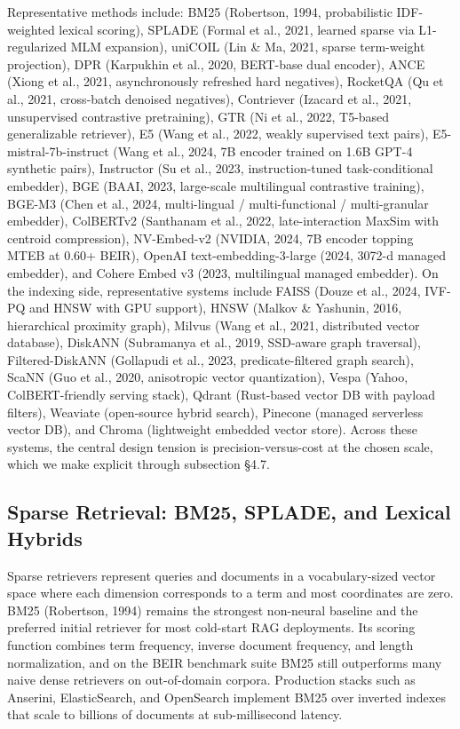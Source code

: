 \documentclass{article}
\begin{document}
Representative methods include: BM25 (Robertson, 1994, probabilistic IDF-weighted lexical scoring), SPLADE (Formal et al., 2021, learned sparse via L1-regularized MLM expansion), uniCOIL (Lin \& Ma, 2021, sparse term-weight projection), DPR (Karpukhin et al., 2020, BERT-base dual encoder), ANCE (Xiong et al., 2021, asynchronously refreshed hard negatives), RocketQA (Qu et al., 2021, cross-batch denoised negatives), Contriever (Izacard et al., 2021, unsupervised contrastive pretraining), GTR (Ni et al., 2022, T5-based generalizable retriever), E5 (Wang et al., 2022, weakly supervised text pairs), E5-mistral-7b-instruct (Wang et al., 2024, 7B encoder trained on 1.6B GPT-4 synthetic pairs), Instructor (Su et al., 2023, instruction-tuned task-conditional embedder), BGE (BAAI, 2023, large-scale multilingual contrastive training), BGE-M3 (Chen et al., 2024, multi-lingual / multi-functional / multi-granular embedder), ColBERTv2 (Santhanam et al., 2022, late-interaction MaxSim with centroid compression), NV-Embed-v2 (NVIDIA, 2024, 7B encoder topping MTEB at 0.60+ BEIR), OpenAI text-embedding-3-large (2024, 3072-d managed embedder), and Cohere Embed v3 (2023, multilingual managed embedder). On the indexing side, representative systems include FAISS (Douze et al., 2024, IVF-PQ and HNSW with GPU support), HNSW (Malkov \& Yashunin, 2016, hierarchical proximity graph), Milvus (Wang et al., 2021, distributed vector database), DiskANN (Subramanya et al., 2019, SSD-aware graph traversal), Filtered-DiskANN (Gollapudi et al., 2023, predicate-filtered graph search), ScaNN (Guo et al., 2020, anisotropic vector quantization), Vespa (Yahoo, ColBERT-friendly serving stack), Qdrant (Rust-based vector DB with payload filters), Weaviate (open-source hybrid search), Pinecone (managed serverless vector DB), and Chroma (lightweight embedded vector store). Across these systems, the central design tension is precision-versus-cost at the chosen scale, which we make explicit through subsection §4.7.

\subsection{Sparse Retrieval: BM25, SPLADE, and Lexical Hybrids}\label{sparse-retrieval-bm25-splade-and-lexical-hybrids}

Sparse retrievers represent queries and documents in a vocabulary-sized vector space where each dimension corresponds to a term and most coordinates are zero. BM25 (Robertson, 1994) remains the strongest non-neural baseline and the preferred initial retriever for most cold-start RAG deployments. Its scoring function combines term frequency, inverse document frequency, and length normalization, and on the BEIR benchmark suite \citep{thakur2021beiraheterogeneous} BM25 still outperforms many naive dense retrievers on out-of-domain corpora. Production stacks such as Anserini, ElasticSearch, and OpenSearch implement BM25 over inverted indexes that scale to billions of documents at sub-millisecond latency.
\end{document}
